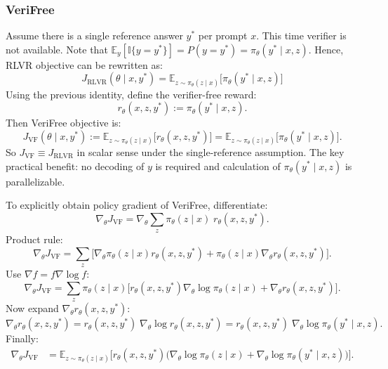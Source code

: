 \documentclass[12pt]{extarticle}
\begin{document}
\subsubsection{VeriFree}

Assume there is a single reference answer \(y^{*}\) per prompt \(x\). This time verifier is not available. Note that \(\mathbb{E}_{y}[\mathbb{I}\{y=y^{*}\}]=P(y=y^{*})=\pi_\theta(y^{*}\mid x,z)\). Hence, RLVR objective can be rewritten as:
\[
  J_{\text{RLVR}}(\theta\mid x,y^{*})=\mathbb{E}_{z\sim\pi_\theta(z\mid x)}\big[\pi_\theta(y^{*}\mid x,z)\big]
\]
Using the previous identity, define the verifier-free reward:
\[
  r_\theta(x,z,y^{*}) := \pi_\theta(y^{*}\mid x,z).
\]
Then VeriFree objective is:
\[
  J_{\text{VF}}(\theta\mid x,y^{*}) := \mathbb{E}_{z\sim\pi_\theta(z\mid x)}\big[r_\theta(x,z,y^{*})\big]
  = \mathbb{E}_{z\sim\pi_\theta(z\mid x)}\big[\pi_\theta(y^{*}\mid x,z)\big].
\]
So \(J_{\text{VF}} \equiv J_{\text{RLVR}}\) in scalar sense under the single-reference assumption. The key practical benefit: no decoding of \(y\) is required and calculation of \(\pi_\theta(y^{*}\mid x,z)\) is parallelizable.

To explicitly obtain policy gradient of VeriFree, differentiate:
\[
  \nabla_\theta J_{\text{VF}}
  = \nabla_\theta \sum_z \pi_\theta(z\mid x)\; r_\theta(x,z,y^{*}).
\]
Product rule:
\[
  \nabla_\theta J_{\text{VF}}
  = \sum_z \Big[\nabla_\theta \pi_\theta(z\mid x)r_\theta(x,z,y^{*}) + \pi_\theta(z\mid x)\nabla_\theta r_\theta(x,z,y^{*})\Big].
\]
Use \(\nabla f = f \nabla \log f\):
\[
  \nabla_\theta J_{\text{VF}}
  =\sum_z \pi_\theta(z\mid x)\Big[r_\theta(x,z,y^{*})\nabla_\theta\log \pi_\theta(z\mid x) + \nabla_\theta r_\theta(x,z,y^{*})\Big].
\]
Now expand \(\nabla_\theta r_\theta(x,z,y^{*})\):
\[
  \nabla_\theta r_\theta(x,z,y^{*}) = r_\theta(x,z,y^{*})\;\nabla_\theta \log r_\theta(x,z,y^{*}) = r_\theta(x,z,y^{*})\;\nabla_\theta \log \pi_\theta(y^{*}\mid x,z).
\]
Finally:
\begin{align*}
  \nabla_\theta J_{\text{VF}}
   & = \mathbb{E}_{z\sim\pi_\theta(z\mid x)}\Big[
    r_\theta(x,z,y^{*})\big(\nabla_\theta\log \pi_\theta(z\mid x)
    +\nabla_\theta\log \pi_\theta(y^{*}\mid x,z)\big)
    \Big].
\end{align*}
\end{document}
